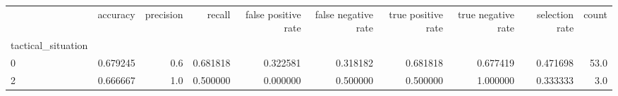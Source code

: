 \begin{tabular}{lrrrrrrrrr}
\toprule
{} &  accuracy &  precision &    recall &  false positive rate &  false negative rate &  true positive rate &  true negative rate &  selection rate &  count \\
tactical\_situation &           &            &           &                      &                      &                     &                     &                 &        \\
\midrule
0                  &  0.679245 &        0.6 &  0.681818 &             0.322581 &             0.318182 &            0.681818 &            0.677419 &        0.471698 &   53.0 \\
2                  &  0.666667 &        1.0 &  0.500000 &             0.000000 &             0.500000 &            0.500000 &            1.000000 &        0.333333 &    3.0 \\
\bottomrule
\end{tabular}
